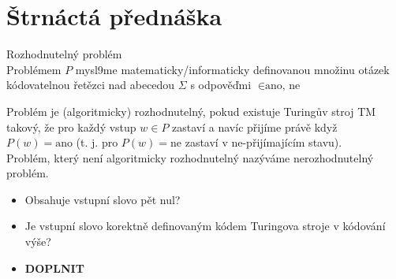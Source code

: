 \documentclass[../main.tex]{subfiles}
\begin{document}
\section{Štrnáctá přednáška}

\begin{definition}
    Rozhodnutelný problém\\

    Problémem $P$ mysl9me matematicky/informaticky definovanou množinu otázek kódovatelnou řetězci nad abecedou $\Sigma$ s odpověďmi $\in {\text{ano, ne}}$

    Problém je (algoritmicky) rozhodnutelný, pokud existuje Turingův stroj TM takový, že pro každý vstup $w \in P$ zastaví a navíc přijíme právě když $P(w) = \text{ano}$
    (t. j. pro $P(w) = \text{ne}$ zastaví v ne-přijímajícím stavu).\\
    Problém, který není algoritmicky rozhodnutelný nazýváme nerozhodnutelný problém. 
\end{definition}
\begin{example}
    \begin{itemize}
        \item Obsahuje vstupní slovo pět nul?
        \item Je vstupní slovo korektně definovaným kódem Turingova stroje v kódování výše?
        \item \textbf{DOPLNIT}
    \end{itemize}
\end{example}
\end{document}

